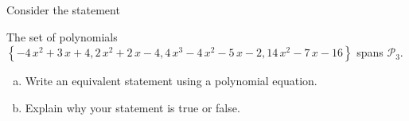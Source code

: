 
\begin{exerciseStatement}


Consider the statement 
\begin{center}\begin{minipage}{0.8\textwidth}
 The set of polynomials \( \left\{ -4 \, x^{2} + 3 \, x + 4 , 2 \, x^{2} + 2 \, x - 4 , 4 \, x^{3} - 4 \, x^{2} - 5 \, x - 2 , 14 \, x^{2} - 7 \, x - 16 \right\} \) spans \(\mathcal{P}_3\). 
\end{minipage}\end{center}
    


\begin{enumerate}[(a)]
\item  Write an equivalent statement using a polynomial equation.
\item  Explain why your statement is true or false.
\end{enumerate}
    
\end{exerciseStatement}
    
